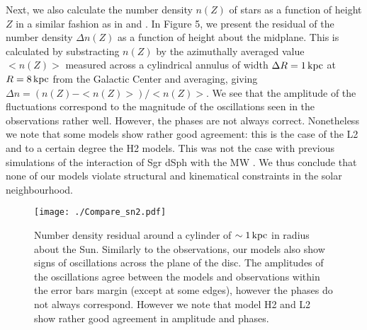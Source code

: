 \documentclass[useAMS,usenatbib]{mnras}
\begin{document}
Next, we also calculate the number density $n(Z)$ of stars as a function of height $Z$ in a similar fashion as in \cite{gomez13} and \cite{laporte16}. In Figure 5, we present the residual of the number density $\Delta n(Z)$ as a function of height about the midplane. This is calculated by substracting $n(Z)$ by the azimuthally averaged value $<n(Z)>$ measured across a cylindrical annulus of width $\Delta R= 1\,\rm{kpc}$ at $R=8\,\rm{kpc}$ from the Galactic Center and averaging, giving $\Delta n = (n(Z)-<n(Z)>)/<n(Z)>$. We see that the amplitude of the fluctuations correspond to the magnitude of the oscillations seen in the observations rather well. However, the phases are not always correct. Nonetheless we note that some models show rather good agreement: this is the case of the L2 and to a certain degree the H2 models. This was not the case with previous simulations of the interaction of Sgr dSph with the MW \citep{purcell11,gomez13,laporte16}. We thus conclude that none of our models violate structural and kinematical constraints in the solar neighbourhood.


\begin{figure}
\texttt{[image: ./Compare\_sn2.pdf]}
\caption[]{Number density residual around a cylinder of $\sim1 \,\rm{kpc}$ in radius about the Sun. Similarly to the observations, our models also show signs of oscillations across the plane of the disc. The amplitudes of the oscillations agree between the models and observations within the error bars margin (except at some edges), however the phases do not always correspond. However we note that model H2 and L2 show rather good agreement in amplitude and phases.}
\end{figure}
\end{document}
